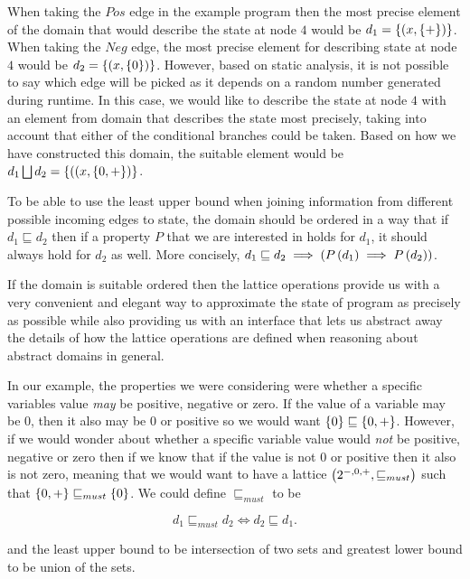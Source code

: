 \documentclass[..thesis.tex]{subfiles}
\begin{document}
When taking the $Pos$ edge in the example program then the most precise element of the domain that would describe the state at node $4$ would be $d_1 = \left\lbrace \left( x, \left\lbrace + \right\rbrace \right) \right\rbrace$. When taking the $Neg$ edge, the most precise element for describing state at node $4$ would be $ d_2 = \left\lbrace \left( x, \left\lbrace 0 \right\rbrace \right) \right\rbrace$. However, based on static analysis, it is not possible to say which edge will be picked as it depends on a random number generated during runtime. In this case, we would like to describe the state at node $4$ with an element from domain that describes the state most precisely, taking into account that either of the conditional branches could be taken. Based on how we have constructed this domain, the suitable element would be $d_1 \bigsqcup d_2 = \left\lbrace \left( (x, \left\lbrace 0, + \right\rbrace \right) \right\rbrace$.

To be able to use the least upper bound when joining information from different possible incoming edges to state, the domain should be ordered in a way that if $d_1 \sqsubseteq d_2$ then if a property $P$ that we are interested in holds for $d_1$, it should always hold for $d_2$ as well. More concisely, $d_1 \sqsubseteq d_2 \implies\left(  P \left( d_1 \right) \implies P \left( d_2 \right) \right)$.

If the domain is suitable ordered then the lattice operations provide us with a very convenient and elegant way to approximate the state of program as precisely as possible while also providing us with an interface that lets us abstract away the details of how the lattice operations are defined when reasoning about abstract domains in general. 

In our example, the properties we were considering were whether a specific variables value \textit{may} be positive, negative or zero. If the value of a variable may be $0$, then it also may be $0$ or positive so we would want $\left\lbrace 0 \right\rbrace \sqsubseteq \left\lbrace 0, + \right\rbrace$. However, if we would wonder about whether a specific variable value would \textit{not} be positive, negative or zero then if we know that if the value is not 0 or positive then it also is not zero, meaning that we would want to have a lattice $\left( 2^{-,0,+}, \sqsubseteq_{must} \right)$ such that $\left\lbrace 0 , + \right\rbrace \sqsubseteq_{must} \left\lbrace 0 \right\rbrace$. We could define $\sqsubseteq_{must}$ to be

\begin{equation*}
d_1 \sqsubseteq_{must} d_2 \iff d_2 \sqsubseteq d_1 \text{.} 
\end{equation*} 

and the least upper bound to be intersection of two sets and greatest lower bound to be union of the sets.
\end{document}
